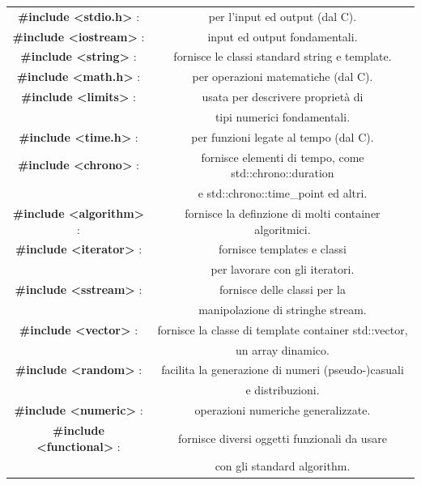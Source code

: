 \begin{tabular}{cc}
	\textbf{\#include <stdio.h>} : & \textsf{\small per l'input ed output (dal C).} \\
	\textbf{\#include <iostream>} : & \textsf{\small input ed output fondamentali.} \\
	\textbf{\#include <string>} : & \textsf{\small fornisce le classi standard string e template.} \\
	\textbf{\#include <math.h>} : & \textsf{\small per operazioni matematiche (dal C).} \\
	\textbf{\#include <limits>} : & \textsf{\small usata per descrivere proprietà di } \\
	\textbf{} & \textsf{tipi numerici fondamentali.} \\
	\textbf{\#include <time.h>} : & \textsf{\small per funzioni legate al tempo (dal C).} \\
	\textbf{\#include <chrono>} : & \textsf{\small fornisce elementi di tempo, come std::chrono::duration } \\
	\textbf{} & \textsf{\small e std::chrono::time\_point ed altri.} \\
	\textbf{\#include <algorithm>} : & \textsf{\small fornisce la definzione di molti container algoritmici.} \\
	\textbf{\#include <iterator>} : & \textsf{\small fornisce templates e classi } \\
	\textbf{} & \textsf{per lavorare con gli iteratori.} \\
	\textbf{\#include <sstream>} : & \textsf{\small fornisce delle classi per la } \\
	\textbf{} & \textsf{manipolazione di stringhe stream.} \\
	\textbf{\#include <vector>} : & \textsf{\small fornisce la classe di template container std::vector, } \\
	\textbf{} & \textsf{\small un array dinamico.} \\
	\textbf{\#include <random>} : & \textsf{\small facilita la generazione di numeri (pseudo-)casuali } \\
	\textbf{} & \textsf{\small e distribuzioni.} \\
	\textbf{\#include <numeric>} : & \textsf{\small operazioni numeriche generalizzate.} \\
	\textbf{\#include <functional>} : & \textsf{\small fornisce diversi oggetti funzionali da usare } \\
	\textbf{} & \textsf{\small con gli standard algorithm.} \\

\end{tabular}
